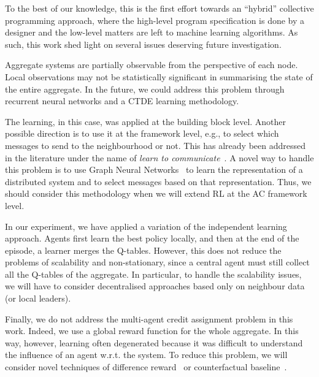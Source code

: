 \documentclass[conference]{IEEEtran}
\begin{document}
To the best of our knowledge, this is the first effort towards an ``hybrid'' collective programming approach, where the high-level program specification is 
 done by a designer and the low-level matters are left to machine learning algorithms.
%
As such, this work shed light on several issues deserving future investigation.

Aggregate systems are partially observable from the perspective of each node. 
 Local observations may not be statistically significant in summarising the state of the entire aggregate. 
 In the future, we could address this problem through recurrent neural networks and a CTDE learning methodology.
 
The learning, in this case, was applied at the building block level. 
 Another possible direction is to use it at the framework level, e.g., to select which messages to send to the neighbourhood or not. 
 This has already been addressed in the literature under the name of \textit{learn to communicate}~\cite{DBLP:journals/corr/abs-1908-03963}. 
A novel way to handle this problem is to use Graph Neural Networks~\cite{DBLP:journals/corr/abs-1812-08434} to learn the representation of a distributed system and to select messages based on that representation. 
 Thus, we should consider this methodology when we will extend RL at the AC framework level.
 
In our experiment, we have applied a variation of the independent learning approach. 
 Agents first learn the best policy locally, and then at the end of the episode, a learner merges the Q-tables. 
 However, this does not reduce the problems of scalability and non-stationary, since a central agent must still collect all the Q-tables of the aggregate. 
 In particular, to handle the scalability issues, we will have to consider decentralised approaches based only on neighbour data (or local leaders).
 
Finally, we do not address the multi-agent credit assignment problem in this work. 
 Indeed, we use a global reward function for the whole aggregate. In this way, however, learning often degenerated because it was difficult to understand the influence of an agent w.r.t. the system. 
 To reduce this problem, we will consider novel techniques of difference reward~\cite{DBLP:conf/atal/AgoginoT04} or counterfactual baseline~\cite{DBLP:journals/corr/FoersterFANW17}.



\end{document}

